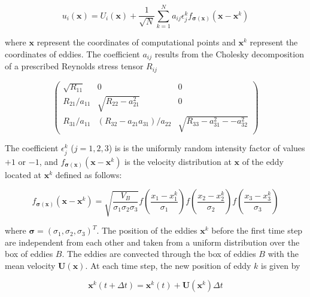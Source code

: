 \begin{equation} \label{SEMvelocity}
u_i(\boldsymbol{x}) = U_i(\boldsymbol{x}) + \frac{1}{\sqrt{N}}\sum_{k=1}^N a_{ij} \epsilon_j^k f_{\boldsymbol{\sigma}(\boldsymbol{x})}(\boldsymbol{x}-\boldsymbol{x}^k)
\end{equation}

\noindent where $\boldsymbol{x}$ represent the coordinates of computational points and $\boldsymbol{x}^k$ represent the coordinates of eddies. The coefficient $a_{ij}$ results from the Cholesky decomposition of a prescribed Reynolds stress tensor $R_{ij}$

\begin{equation} \label{LundCoefficients}
\left(\begin{matrix}
\sqrt{R_{11}} & 0 & 0 \\
R_{21}/a_{11} & \sqrt{R_{22}-a_{21}^2} & 0 \\
R_{31}/a_{11}  & (R_{32}-a_{21}a_{31})/a_{22} & \sqrt{R_{33}-a_{31}^2--a_{32}^2}
\end{matrix}\right)
\end{equation}

\noindent The coefficient $\epsilon_j^k$ ($j=1,2,3$) is is the uniformly random intensity factor of values $+1$ or $-1$, and $f_{\boldsymbol{\sigma}(\boldsymbol{x})} (\boldsymbol{x}-\boldsymbol{x}^k)$ is the velocity distribution at $\boldsymbol{x}$ of the eddy located at $\boldsymbol{x}^k$ defined as follows:

\begin{equation} \label{eddyType}
f_{\boldsymbol{\sigma}(\boldsymbol{x})} (\boldsymbol{x}-\boldsymbol{x}^k) = \sqrt{\frac{V_B}{\sigma_1\sigma_2\sigma_3}}f\left(\frac{x_1-x_1^k}{\sigma_1}\right)f\left(\frac{x_2-x_2^k}{\sigma_2}\right)f\left(\frac{x_3-x_3^k}{\sigma_3}\right)
\end{equation}

\noindent where $\boldsymbol{\sigma}=(\sigma_1,\sigma_2,\sigma_3)^T$. The position of the eddies $\boldsymbol{x}^k$ before the first time step are independent from each other and taken from a uniform distribution over the box of eddies $B$. The eddies are convected through the box of eddies $B$ with the mean velocity $\boldsymbol{U}(\boldsymbol{x})$. At each time step, the new position of eddy $k$ is given by

\begin{equation}
\boldsymbol{x}^k(t+\Delta t) = \boldsymbol{x}^k(t)+\boldsymbol{U}(\boldsymbol{x}^k)\Delta t
\end{equation}

